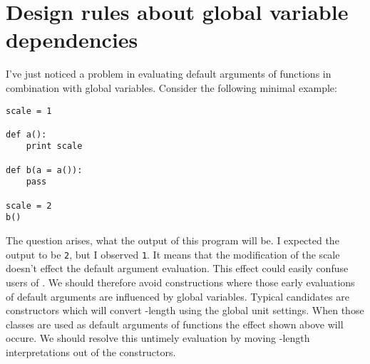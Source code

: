 \documentclass{article}
\begin{document}
\section*{Design rules about global variable dependencies}

I've just noticed a problem in evaluating default arguments of
functions in combination with global variables. Consider the following
minimal example:

\begin{verbatim}
scale = 1

def a():
    print scale

def b(a = a()):
    pass

scale = 2
b()
\end{verbatim}

The question arises, what the output of this program will be. I
expected the output to be \verb|2|, but I observed \verb|1|. It means
that the modification of the scale doesn't effect the default argument
evaluation. This effect could easily confuse users of \PyX. We should
therefore avoid constructions where those early evaluations of default
arguments are influenced by global variables. Typical candidates are
constructors which will convert \PyX-length using the global unit
settings. When those classes are used as default arguments of
functions the effect shown above will occure. We should resolve this
untimely evaluation by moving \PyX-length interpretations out of the
constructors.
\end{document}
